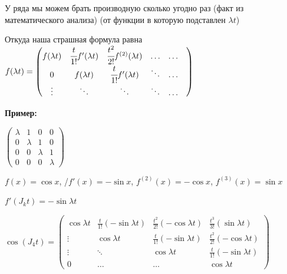 У ряда мы можем брать производную сколько угодно раз (факт из математического анализа) (от функции в которую подставлен $\lambda t$)

Откуда наша страшная формула равна $f(\lambda t) = \begin{pmatrix}
    f(\lambda t) & \cfrac{t}{1!}f'(\lambda t) & \cfrac{t^2}{2!}f^{(2)}(\lambda t) & \ldots & \ldots & \\
    0 & f(\lambda t) & \cfrac{t}{1!}f'(\lambda t) &\ddots &\ldots
    \\
    \vdots & \ddots & \ddots & \ddots& \ldots
\end{pmatrix}$


\textbf{Пример:}

$\begin{pmatrix}
    \lambda & 1 & 0 & 0 \\
    0 & \lambda & 1 & 0\\
    0 & 0 & \lambda & 1\\
    0 & 0 & 0 & \lambda
\end{pmatrix}$

$f(x)=\cos x$, /$f'{(x)} = - \sin x$, $f^{(2)}{(x)} = - \cos x$, $f^{(3)}{(x)} =  \sin x$

$f'(J_k t)=- \sin \lambda t$

$\cos (J_4t) = \begin{pmatrix}
    \cos \lambda t & \frac{t}{1!}(-\sin \lambda t) &\frac{t^2}{2!}(-\cos \lambda t) & \frac{t^3}{3!}(\sin \lambda t)\\
    \vdots & \cos \lambda t & \frac{t}{1!}(-\sin \lambda t) &\frac{t^2}{2!}(-\cos \lambda t) \\
    \vdots & \ddots & \cos \lambda t & \frac{t}{1!}(-\sin \lambda t) \\
    0 & \ldots & \ldots & \cos \lambda t
\end{pmatrix}$






